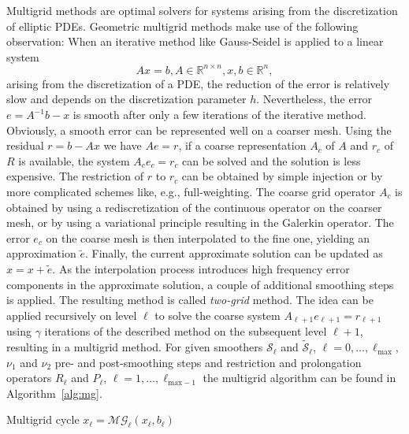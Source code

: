Multigrid methods are optimal solvers for systems arising from the
discretization of elliptic PDEs. Geometric multigrid methods make use of the
following observation: When an iterative method like Gauss-Seidel is
applied to a linear system
\[
  A x = b, A \in \mathbb{R}^{n \times n}, x, b \in \mathbb{R}^n,
\]
arising from the discretization of a PDE, the reduction of the error
is relatively slow and depends on the discretization parameter
$h$. Nevertheless, the error $e = A^{-1} b - x$ is smooth after only a
few iterations of the iterative method. Obviously, a smooth error can
be represented well on a coarser mesh. Using the residual
$r = b - A x$ we have $A e = r$, if a coarse representation $A_c$ of
$A$ and $r_c$ of $R$ is available, the system $A_c e_c = r_c$ can be
solved and the solution is less expensive. The restriction of $r$ to
$r_c$ can be obtained by simple injection or by more complicated
schemes like, e.g., full-weighting. The coarse grid operator $A_c$ is
obtained by using a rediscretization of the continuous operator on the
coarser mesh, or by using a variational principle resulting in the
Galerkin operator. The error $e_c$ on the coarse mesh is then
interpolated to the fine one, yielding an approximation
$\tilde{e}$. Finally, the current approximate solution can be updated
as $x = x + \tilde{e}$. As the interpolation process introduces high
frequency error components in the approximate solution, a couple of
additional smoothing steps is applied. The resulting method is called
\emph{two-grid} method. The idea can be applied recursively on level
$\ell$ to solve the coarse system $A_{\ell+1} e_{\ell+1} = r_{\ell+1}$
using $\gamma$ iterations of the described method on the subsequent
level $\ell+1$, resulting in a multigrid method. For given smoothers
$\mathcal{S}_\ell$ and $\tilde{\mathcal{S}}_\ell$,
$\ell = 0,\dots,\ell_\text{max}$, $\nu_1$ and $\nu_2$ pre- and
post-smoothing steps and restriction and prolongation operators
$R_\ell$ and $P_\ell$, $\ell = 1,\dots,\ell_{\text{max}-1}$ the
multigrid algorithm can be found in Algorithm~\ref{alg:mg}.

\begin{algorithm}
  \caption{Multigrid cycle $x_\ell = \mathcal{MG}_\ell(x_\ell,b_\ell)$}
  \label{alg:mg}
  \begin{algorithmic}
  \ELSE
  \ENDIF
  \end{algorithmic}
\end{algorithm}

